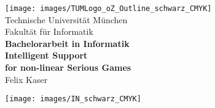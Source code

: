 \thispagestyle{empty}
\vspace*{2cm}
\begin{center}
  \texttt{[image: images/TUMLogo\_oZ\_Outline\_schwarz\_CMYK]}\\              \vspace{.5cm}
  {\Large \sc Technische Universität München}\\         \vspace{1cm}
  {\Huge \sc Fakultät für Informatik\\[1mm]}            \vspace{2cm}
  {\Large \textbf{Bachelorarbeit in Informatik}}\\      \vspace{1.5cm}
  {\huge \textbf{Intelligent Support}}\\ \vspace*{3mm}
  {\huge \textbf{for non-linear Serious Games}}\\               \vspace{1.5cm}
  Felix Kaser
  
  \vspace{1cm}
  \texttt{[image: images/IN\_schwarz\_CMYK]}
\end{center}
\newpage
\thispagestyle{empty}
\cleardoublepage
\thispagestyle{empty}

